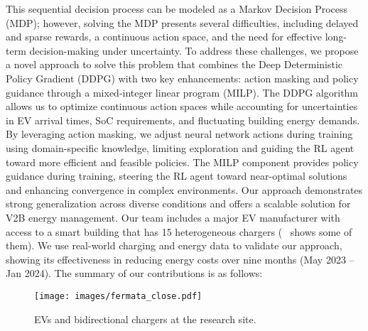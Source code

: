 This sequential decision process can be modeled as a Markov Decision Process (MDP); however, solving the MDP presents several difficulties, including delayed and sparse rewards, a continuous action space, and the need for effective long-term decision-making under uncertainty. 
To address these challenges, we propose a novel approach to solve this problem that combines the Deep Deterministic Policy Gradient (DDPG) with two key enhancements: action masking and policy guidance through a mixed-integer linear program (MILP). The DDPG algorithm allows us to optimize continuous action spaces while accounting for uncertainties in EV arrival times, SoC requirements, and fluctuating building energy demands. By leveraging action masking, we adjust neural network actions during training using domain-specific knowledge, limiting exploration and guiding the RL agent toward more efficient and feasible policies.  The MILP component provides policy guidance during training, steering the RL agent toward near-optimal solutions and enhancing convergence in complex environments. 
Our approach demonstrates strong generalization across diverse conditions and offers a scalable solution for V2B energy management.
Our team includes a major EV manufacturer with access to a smart building that has 15 heterogeneous chargers (~ shows some of them). We use real-world charging and energy data to validate our approach, showing its effectiveness in reducing energy costs over nine months (May 2023 – Jan 2024). The summary of our contributions is as follows:  
\begin{figure}[t]
    \centering
    \texttt{[image: images/fermata\_close.pdf]}
    \caption{EVs and bidirectional chargers at the research site.}
    \label{fig: EV chargers}    
\end{figure}  

